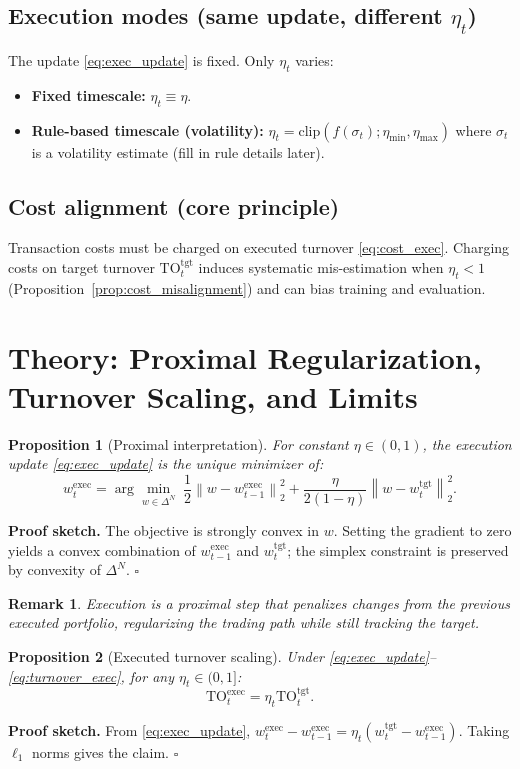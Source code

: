 \documentclass[10pt,twocolumn]{article}
\newtheorem{proposition}{Proposition}
\newtheorem{remark}{Remark}
\newcommand{\wexec}{w^{\mathrm{exec}}}
\newcommand{\wtgt}{w^{\mathrm{tgt}}}
\newcommand{\TOexec}{\mathrm{TO}^{\mathrm{exec}}}
\newcommand{\TOtgt}{\mathrm{TO}^{\mathrm{tgt}}}
\newcommand{\normtwo}[1]{\left\lVert #1 \right\rVert_2}
\newcommand{\DeltaN}{\Delta^N}
\begin{document}
\subsection{Execution modes (same update, different $\eta_t$)}
The update \eqref{eq:exec_update} is fixed. Only $\eta_t$ varies:
\begin{itemize}[leftmargin=*,itemsep=1pt]
\item \textbf{Fixed timescale:} $\eta_t\equiv\eta$.
\item \textbf{Rule-based timescale (volatility):} $\eta_t = \mathrm{clip}(f(\sigma_t); \eta_{\min},\eta_{\max})$ where $\sigma_t$ is a volatility estimate (fill in rule details later).
\end{itemize}

\subsection{Cost alignment (core principle)}
Transaction costs must be charged on executed turnover \eqref{eq:cost_exec}. Charging costs on target turnover $\TOtgt_t$ induces systematic mis-estimation when $\eta_t<1$ (Proposition~\ref{prop:cost_misalignment}) and can bias training and evaluation.

\section{Theory: Proximal Regularization, Turnover Scaling, and Limits}
\label{sec:theory}

\begin{proposition}[Proximal interpretation]\label{prop:prox}
For constant $\eta\in(0,1)$, the execution update \eqref{eq:exec_update} is the unique minimizer of:
\[
\wexec_t=\arg\min_{w \in \DeltaN}\;
\frac{1}{2}\normtwo{w-\wexec_{t-1}}^2 + \frac{\eta}{2(1-\eta)}\normtwo{w-\wtgt_t}^2.
\]
\end{proposition}
\noindent\textbf{Proof sketch.} The objective is strongly convex in $w$. Setting the gradient to zero yields a convex combination of $\wexec_{t-1}$ and $\wtgt_t$; the simplex constraint is preserved by convexity of $\DeltaN$. \hfill$\square$
\begin{remark}
Execution is a proximal step that penalizes \emph{changes from the previous executed portfolio}, regularizing the trading path while still tracking the target.
\end{remark}

\begin{proposition}[Executed turnover scaling]\label{prop:turnover_scaling}
Under \eqref{eq:exec_update}--\eqref{eq:turnover_exec}, for any $\eta_t\in(0,1]$:
\[
\TOexec_t = \eta_t \TOtgt_t.
\]
\end{proposition}
\noindent\textbf{Proof sketch.} From \eqref{eq:exec_update},
$\wexec_t-\wexec_{t-1}=\eta_t(\wtgt_t-\wexec_{t-1})$.
Taking $\ell_1$ norms gives the claim. \hfill$\square$
\end{document}
